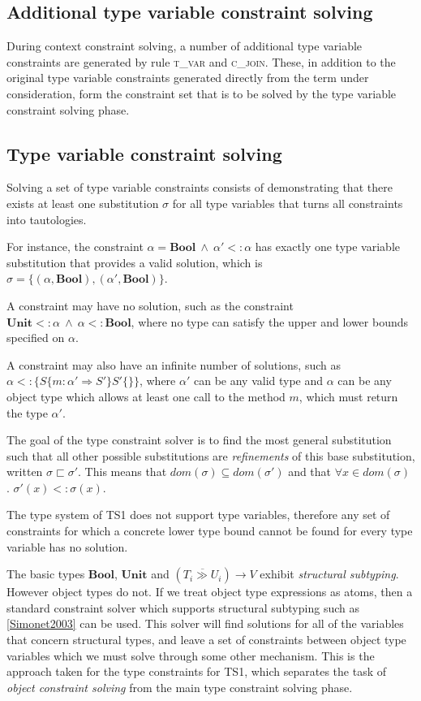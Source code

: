 \documentclass[preprint]{sigplanconf}
\newcommand{\unitt}{\mathbf{Unit}}
\newcommand{\boolt}{\mathbf{Bool}}
\newcommand{\funt}[3]{(\overline{#1 \gg #2}) \rightarrow #3}
\newcommand{\cand}{\:\wedge\:}
\begin{document}
\subsection{Additional type variable constraint solving}

During context constraint solving, a number of additional type variable
constraints are generated by rule \textsc{t\_var} and \textsc{c\_join}.
These, in addition to the original type variable constraints generated
directly from the term under consideration, form the constraint set that
is to be solved by the type variable constraint solving phase.

\subsection{Type variable constraint solving}

Solving a set of type variable constraints consists of demonstrating that
there exists at least one substitution $\sigma$ for all type variables that 
turns all constraints into tautologies.

For instance, the constraint
$\alpha = \boolt \cand \alpha' <: \alpha$ has exactly one type variable 
substitution that provides a valid solution, which is 
$\sigma = \{ (\alpha, \boolt), (\alpha', \boolt) \}$. 

A constraint may have no solution, such as the constraint 
$\unitt <: \alpha \cand \alpha <: \boolt$, where no type can satisfy the upper
and lower bounds specified on $\alpha$.

A constraint may also have an infinite number of solutions, such as 
$\alpha <: \{ S \{ m : \alpha' \Rightarrow S' \} S' \{\} \}$, where
$\alpha'$ can be any valid type and $\alpha$ can be any object type which 
allows at least one call to the method $m$, which must return the type 
$\alpha'$.

The goal of the type constraint solver is to find the most general substitution
such that all other possible substitutions are {\it refinements} of this base
substitution, written $\sigma \sqsubset \sigma'$. This means that 
$dom(\sigma) \subseteq dom(\sigma')$ and that 
$\forall x \in dom(\sigma)$ . $\sigma'(x) <: \sigma(x)$.

The type system of TS1 does not support type variables, therefore any
set of constraints for which a concrete lower type bound cannot be found 
for every type variable has no solution.

The basic types $\boolt$, $\unitt$ and $\funt{T_i}{U_i}{V}$ exhibit 
{\it structural subtyping}. However object types do not. If we treat object 
type expressions as atoms,
then a standard constraint solver which supports structural subtyping such as 
\ref{Simonet2003} can be used. This solver will find solutions for all of the 
variables that concern structural types, and leave a set of constraints between 
object type variables which we must solve through some other mechanism. 
This is the approach taken for the type constraints for TS1, which separates 
the task of {\it object constraint solving} from the main type constraint 
solving phase.
\end{document}

